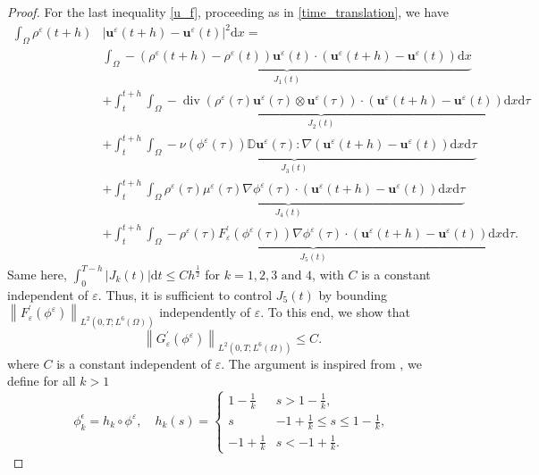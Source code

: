 \documentclass[11pt]{article}
\def\bq{\begin{equation}}
\def\eq{\end{equation}}
\def\bfu{\mathbf{u}}
\def\md{\mathrm{d}}
\def\bq{\begin{equation}}
\def\eq{\end{equation}}
\begin{document}
{\begin{proof}
For the last inequality \eqref{u_f}, proceeding as in \eqref{time_translation}, we have
\bq
\begin{aligned}\label{time_translation_2}
 \int_{\Omega} \rho^{\varepsilon}(t+h)&\left|\bfu^{\varepsilon}(t+h)-\bfu^{\varepsilon}(t)\right|^2 \md x
 =\\ 
&\underbrace{\int_{\Omega}-\left(\rho^{\varepsilon}(t+h)-\rho^{\varepsilon}(t)\right) \bfu^{\varepsilon}(t) \cdot\left(\bfu^{\varepsilon}(t+h)-\bfu^{\varepsilon}(t)\right) \mathrm{d} x}_{J_1(t)} \\
& +\underbrace{\int_t^{t+h} \int_{\Omega}-\operatorname{div}\left(\rho^{\varepsilon}(\tau) \bfu^{\varepsilon}(\tau) \otimes \bfu^{\varepsilon}(\tau)\right) \cdot\left(\bfu^{\varepsilon}(t+h)-\bfu^{\varepsilon}(t)\right) \mathrm{d} x \md \tau}_{J_2(t)} \\
& +\underbrace{\int_t^{t+h} \int_{\Omega}-\nu\left(\phi^{\varepsilon}(\tau)\right) \mathbb{D} \bfu^{\varepsilon}(\tau): \nabla\left(\bfu^{\varepsilon}(t+h)-\bfu^{\varepsilon}(t)\right) \mathrm{d} x \md \tau}_{J_3(t)} \\
& +\underbrace{\int_t^{t+h} \int_{\Omega} \rho^{\varepsilon}(\tau) \mu^{\varepsilon}(\tau) \nabla \phi^{\varepsilon}(\tau) \cdot\left(\bfu^{\varepsilon}(t+h)-\bfu^{\varepsilon}(t)\right) \mathrm{d} x \md \tau}_{J_4(t)} \\
& +\underbrace{\int_t^{t+h} \int_{\Omega}-\rho^{\varepsilon}(\tau) F_{\varepsilon}^{\prime}\left(\phi^{\varepsilon}(\tau)\right) \nabla \phi^{\varepsilon}(\tau) \cdot\left(\bfu^{\varepsilon}(t+h)-\bfu^{\varepsilon}(t)\right) \mathrm{d} x \md \tau}_{J_5(t)}. 
\end{aligned}
\eq
Same here, $\int_{0}^{T-h} |J_k(t)| \md t \leq C h^{\frac{1}{2}}$ for $k=1,2,3\text{ and } 4$, with $C$ is a constant independent of $\varepsilon$. Thus, it is sufficient to control $J_5(t)$ by bounding $\left\|F_{\varepsilon}^{\prime}\left(\phi^{\varepsilon}\right)\right\|_{L^2(0,T;{L^6(\Omega)})}$ independently of $\varepsilon$. To this end, we show that
$$\left\|G_{\varepsilon}^{\prime}\left(\phi^{\varepsilon}\right)\right\|_{L^2(0,T;{L^6(\Omega)})} \leq C.$$
where $C$ is a constant independent of $\varepsilon$.
The argument is inspired from \cite{Abel}, we define for all $k>1$
$$
\phi_k^{\epsilon}=h_k \circ \phi^{\varepsilon}, \quad h_k(s)= \begin{cases}1-\frac{1}{k} & s>1-\frac{1}{k}, \\ s & -1+\frac{1}{k} \leq s \leq 1-\frac{1}{k}, \\ -1+\frac{1}{k} & s<-1+\frac{1}{k} .\end{cases}
$$



\end{proof}}
\end{document}
